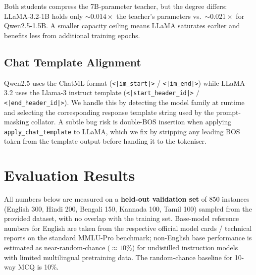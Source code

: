 \documentclass[11pt,a4paper]{article}
\begin{document}
Both students compress the 7B-parameter teacher, but the degree differs: LLaMA-3.2-1B
holds only $\sim\!0.014\times$ the teacher's parameters vs.\ $\sim\!0.021\times$ for
Qwen2.5-1.5B.  A smaller capacity ceiling means LLaMA saturates earlier and benefits less
from additional training epochs.

\subsection{Chat Template Alignment}

Qwen2.5 uses the ChatML format (\texttt{<|im\_start|>} / \texttt{<|im\_end|>}) while
LLaMA-3.2 uses the Llama-3 instruct template
(\texttt{<|start\_header\_id|>} / \texttt{<|end\_header\_id|>}).
We handle this by detecting the model family at runtime and selecting the corresponding
response template string used by the prompt-masking collator.  A subtle bug risk is
double-BOS insertion when applying \texttt{apply\_chat\_template} to LLaMA, which we fix
by stripping any leading BOS token from the template output before handing it to the
tokeniser.

\section{Evaluation Results}

All numbers below are measured on a \textbf{held-out validation set} of 850 instances
(English 300, Hindi 200, Bengali 150, Kannada 100, Tamil 100) sampled from the
provided dataset, with no overlap with the training set.  Base-model reference numbers
for English are taken from the respective official model cards / technical reports on the
standard MMLU-Pro benchmark; non-English base performance is estimated as
near-random-chance ($\approx\!10\%$) for undistilled instruction models with limited
multilingual pretraining data.  The random-chance baseline for 10-way MCQ is 10\%.
\end{document}
